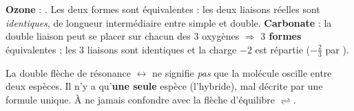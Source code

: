 \documentclass[11pt,a4paper]{article}
\begin{document}
\begin{exemplebox}
\textbf{Ozone}  : . Les deux formes sont équivalentes : les deux
liaisons  réelles sont \emph{identiques}, de longueur intermédiaire entre simple et double.
\quad \textbf{Carbonate}  : la double liaison peut se placer sur chacun des $3$ oxygènes
$\Rightarrow$ \textbf{$3$ formes} équivalentes ; les $3$ liaisons  sont identiques et la
charge $-2$ est répartie ($-\tfrac{2}{3}$ par ).
\end{exemplebox}

\begin{piege}
La double flèche de résonance $\leftrightarrow$ ne signifie \emph{pas} que la molécule oscille
entre deux espèces. Il n'y a qu'\textbf{une seule} espèce (l'hybride), mal décrite par une formule
unique. À ne jamais confondre avec la flèche d'équilibre $\rightleftharpoons$.
\end{piege}
\end{document}

